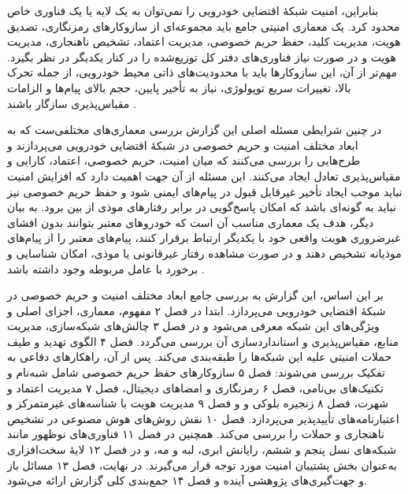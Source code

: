 \documentclass[12pt,a4paper]{article}
\begin{document}
بنابراین، امنیت شبکهٔ اقتضایی خودرویی را نمی‌توان به یک لایه یا یک فناوری خاص محدود کرد. یک معماری امنیتی جامع باید مجموعه‌ای از سازوکار‌های رمزنگاری، تصدیق هویت، مدیریت کلید، حفظ حریم خصوصی، مدیریت اعتماد، تشخیص ناهنجاری، مدیریت هویت و در صورت نیاز فناوری‌های دفتر کل توزیع‌شده را در کنار یکدیگر در نظر بگیرد. مهم‌تر از آن، این سازوکار‌ها باید با محدودیت‌های ذاتی محیط خودرویی، از جمله تحرک بالا، تغییرات سریع توپولوژی، نیاز به تأخیر پایین، حجم بالای پیام‌ها و الزامات مقیاس‌پذیری سازگار باشند \cite{farsimadanReviewSecurityChallenges2025,rahmawatiagustinaSystematicLiteratureReview2025}.

در چنین شرایطی مسئله اصلی این گزارش بررسی معماری‌های مختلفی‌ست که به ابعاد مختلف امنیت و حریم خصوصی در شبکهٔ اقتضایی خودرویی می‌پردازند و طرح‌هایی را بررسی می‌کنند که میان امنیت، حریم خصوصی، اعتماد، کارایی و مقیاس‌پذیری تعادل ایجاد می‌کنند. این مسئله از آن جهت اهمیت دارد که افزایش امنیت نباید موجب ایجاد تأخیر غیرقابل قبول در پیام‌های ایمنی شود و حفظ حریم خصوصی نیز نباید به گونه‌ای باشد که امکان پاسخ‌گویی در برابر رفتار‌های موذی از بین برود. به بیان دیگر، هدف یک معماری مناسب آن است که خودرو‌های معتبر بتوانند بدون افشای غیرضروری هویت واقعی خود با یکدیگر ارتباط برقرار کنند، پیام‌های معتبر را از پیام‌های موذیانه تشخیص دهند و در صورت مشاهده رفتار غیرقانونی یا موذی، امکان شناسایی و برخورد با عامل مربوطه وجود داشته باشد \cite{rahmawatiagustinaSystematicLiteratureReview2025,VanetSecurityPrivacy}.

بر این اساس، این گزارش به بررسی جامع ابعاد مختلف امنیت و حریم خصوصی در شبکهٔ اقتضایی خودرویی می‌پردازد. ابتدا در فصل ۲ مفهوم، معماری، اجزای اصلی و ویژگی‌های این شبکه معرفی می‌شود و در فصل ۳ چالش‌های شبکه‌سازی، مدیریت منابع، مقیاس‌پذیری و استانداردسازی آن بررسی می‌گردد. فصل ۴ الگوی تهدید و طیف حملات امنیتی علیه این شبکه‌ها را طبقه‌بندی می‌کند. پس از آن، راهکار‌های دفاعی به تفکیک بررسی می‌شوند: فصل ۵ سازوکار‌های حفظ حریم خصوصی شامل شبه‌نام و تکنیک‌های بی‌نامی، فصل ۶ رمزنگاری و امضا‌های دیجیتال، فصل ۷ مدیریت اعتماد و شهرت، فصل ۸ زنجیره بلوکی و  و فصل ۹ مدیریت هویت با شناسه‌های غیرمتمرکز و اعتبارنامه‌های تأییدپذیر می‌پردازد. فصل ۱۰ نقش روش‌های هوش مصنوعی در تشخیص ناهنجاری و حملات را بررسی می‌کند. همچنین در فصل ۱۱ فناوری‌های نوظهور مانند شبکه‌های نسل پنجم و ششم، رایانش ابری، لبه و مه، و در فصل ۱۲ لایهٔ سخت‌افزاری به‌عنوان بخش پشتیبان امنیت مورد توجه قرار می‌گیرند. در نهایت، فصل ۱۳ مسائل باز و جهت‌گیری‌های پژوهشی آینده و فصل ۱۴ جمع‌بندی کلی گزارش ارائه می‌شود.

\end{document}
